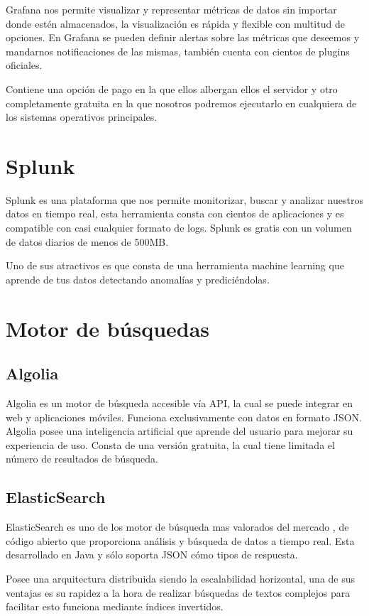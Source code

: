 Grafana nos permite visualizar y representar métricas de datos sin importar donde estén almacenados, la visualización es rápida y flexible con multitud de opciones. En Grafana se pueden definir alertas sobre las métricas que deseemos y mandarnos notificaciones de las mismas, también cuenta con cientos de plugins oficiales. 

Contiene una opción de pago en la que ellos albergan ellos el servidor y otro completamente gratuita en la que nosotros podremos ejecutarlo en cualquiera de los sistemas operativos principales.\cite{pagina:Grafana}
\section{Splunk}
Splunk es una plataforma que nos permite monitorizar, buscar y analizar nuestros datos en tiempo real, esta herramienta consta con cientos de aplicaciones y es compatible con casi cualquier formato de logs. Splunk es gratis con un volumen de datos diarios de menos de 500MB. \cite{pagina:Splunk}

Uno de sus atractivos es que consta de una herramienta machine learning que aprende de tus datos detectando anomalías y prediciéndolas.
\section{Motor de búsquedas}

\subsection{Algolia}
Algolia es un motor de búsqueda accesible vía API, la cual se puede integrar en web y aplicaciones móviles. Funciona exclusivamente con datos en formato JSON. Algolia posee una inteligencia artificial que aprende del usuario para mejorar su experiencia de uso. Consta de una versión gratuita, la cual tiene limitada el número de resultados de búsqueda.\cite{pagina:Algolia}

\subsection{ElasticSearch}
ElasticSearch es uno de los motor de búsqueda mas valorados del mercado\cite{ranking:DB-Engines} , de código abierto que proporciona análisis y búsqueda de datos a tiempo real. Esta desarrollado en Java y sólo soporta JSON cómo tipos de respuesta.

Posee una arquitectura distribuida siendo la escalabilidad horizontal, una de sus ventajas es su rapidez a la hora de realizar búsquedas de textos complejos para facilitar esto funciona mediante índices invertidos.\cite{pagina:ElasticSearch}  


